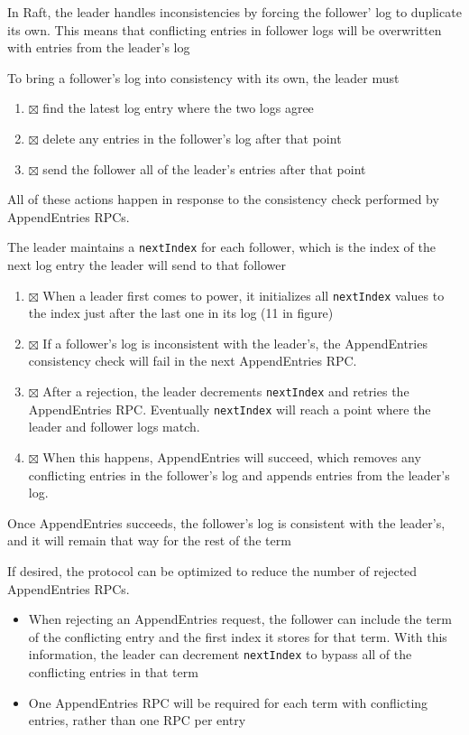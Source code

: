 \documentclass[11pt]{article}
\begin{document}
In Raft, the leader handles inconsistencies by forcing the follower' log to duplicate its own.
This means that conflicting entries in follower logs will be overwritten with entries from the
leader's log

To bring a follower's log into consistency with its own, the leader must
\begin{enumerate}
\item{$\boxtimes$} find the latest log entry where the two logs agree
\item{$\boxtimes$} delete any entries in the follower's log after that point
\item{$\boxtimes$} send the follower all of the leader's entries after that point
\end{enumerate}
All of these actions happen in response to the consistency check performed by AppendEntries
RPCs.

The leader maintains a \texttt{nextIndex} for each follower, which is the index of the next log entry the
leader will send to that follower
\begin{enumerate}
\item{$\boxtimes$} When a leader first comes to power, it initializes all \texttt{nextIndex} values to the index just
after the last one in its log (11 in figure)
\item{$\boxtimes$} If a follower's log is inconsistent with the leader's, the AppendEntries consistency check
will fail in the next AppendEntries RPC.
\item{$\boxtimes$} After a rejection, the leader decrements \texttt{nextIndex} and retries the AppendEntries RPC.
Eventually \texttt{nextIndex} will reach a point where the leader and follower logs match.
\item{$\boxtimes$} When this happens, AppendEntries will succeed, which removes any conflicting entries in the
follower's log and appends entries from the leader's log.
\end{enumerate}

Once AppendEntries succeeds, the follower's log is consistent with the leader's, and it will
remain that way for the rest of the term

If desired, the protocol can be optimized to reduce the number of rejected AppendEntries RPCs.
\begin{itemize}
\item When rejecting an AppendEntries request, the follower can include the term of the conflicting
entry and the first index it stores for that term. With this information, the leader can
decrement \texttt{nextIndex} to bypass all of the conflicting entries in that term
\item One AppendEntries RPC will be required for each term with conflicting entries, rather than one
RPC per entry
\end{itemize}
\end{document}
